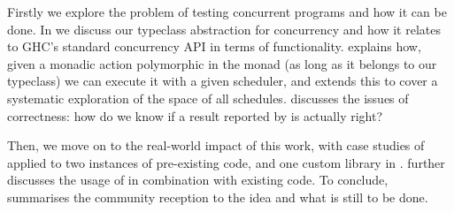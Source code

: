 Firstly we explore the problem of testing concurrent programs and how
it can be done. In \textbf{} we discuss our
typeclass abstraction for concurrency and how it relates to GHC's
standard concurrency API in terms of
functionality. \textbf{} explains how, given a monadic
action polymorphic in the monad (as long as it belongs to our
typeclass) we can execute it with a given scheduler, and
\textbf{} extends this to cover a systematic exploration of
the space of all schedules. \textbf{} discusses the
issues of correctness: how do we know if a result reported by
\dejafu{} is actually right?

Then, we move on to the real-world impact of this work, with case
studies of \dejafu{} applied to two instances of pre-existing code,
and one custom library in \textbf{}.
\textbf{} further discusses the usage of \dejafu{} in
combination with existing code. To conclude,
\textbf{} summarises the community reception to the
idea and what is still to be done.
